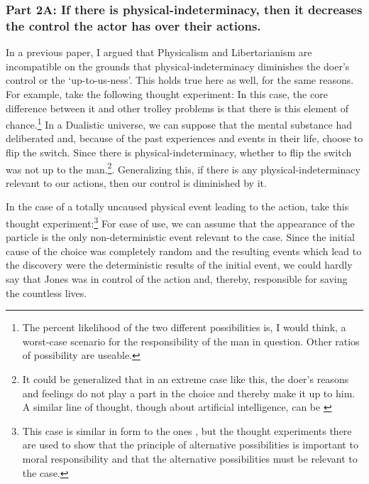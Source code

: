 \subsubsection{Part 2A: If there is physical-indeterminacy, then it decreases the control the actor has over their actions.}
In a previous paper, I argued that Physicalism and Libertarianism are incompatible on the grounds that physical-indeterminacy diminishes the doer’s control or the ‘up-to-us-ness’. This holds true here as well, for the same reasons. For example, take the following thought experiment:
In this case, the core difference between it and other trolley problems is that there is this element of chance.\footnote{The percent likelihood of the two different possibilities is, I would think, a worst-case scenario for the responsibility of the man in question. Other ratios of possibility are useable.}  In a Dualistic universe, we can suppose that the mental substance had deliberated and, because of the past experiences and events in their life, choose to flip the switch. Since there is physical-indeterminacy, whether to flip the switch was not up to the man.\footnote{It could be generalized that in an extreme case like this, the doer’s reasons and feelings do not play a part in the choice and thereby make it up to him. A similar line of thought, though about artificial intelligence, can be \cite[found in][ ]{Searle1}}.  Generalizing this, if there is any physical-indeterminacy relevant to our actions, then our control is diminished by it. 

In the case of a totally uncaused physical event leading to the action, take this thought experiment:\footnote{This case is similar in form to the ones \cite[seen in][ ]{Elzein1}, but the thought experiments there are used to show that the principle of alternative possibilities is important to moral responsibility and that the alternative possibilities must be relevant to the case.}
For ease of use, we can assume that the appearance of the particle is the only non-deterministic event relevant to the case. Since the initial cause of the choice was completely random and the resulting events which lead to the discovery were the deterministic results of the initial event, we could hardly say that Jones was in control of the action and, thereby, responsible for saving the countless lives.
